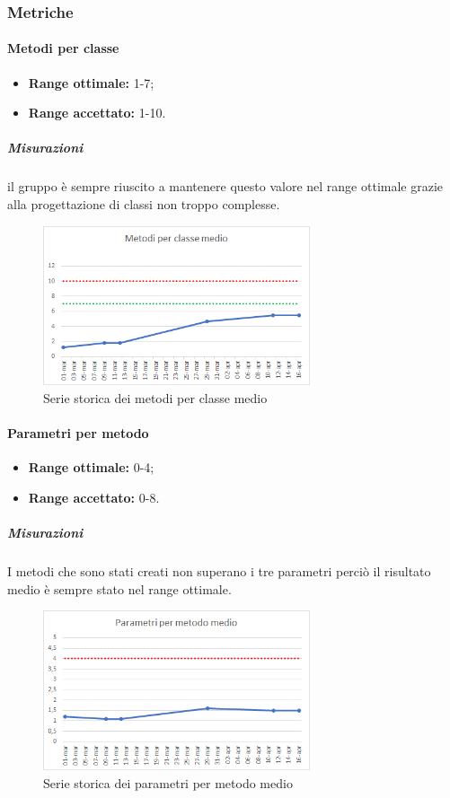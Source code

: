		\subsubsection{Metriche}
			\paragraph{Metodi per classe} \Spazio
			\begin{itemize}
				\item \textbf{Range ottimale:} 1-7; 
				\item \textbf{Range accettato:} 1-10.
			\end{itemize}
		    \subparagraph{Misurazioni}
		    il gruppo è sempre riuscito a mantenere questo valore nel range ottimale grazie alla progettazione di classi non troppo complesse.
		    \begin{figure}[H]
		    	\centering 
		    	\includegraphics[width=0.7\textwidth]{Images/metodi.png}
		    	\caption{Serie storica dei metodi per classe medio}
		    	\label{metodi} 
		    \end{figure}
	        
			\paragraph{Parametri per metodo} \Spazio
			\begin{itemize}
				\item \textbf{Range ottimale:} 0-4;
				\item \textbf{Range accettato:} 0-8.
			\end{itemize}
		    \subparagraph{Misurazioni}
		    I metodi che sono stati creati non superano i tre parametri perciò il risultato medio è sempre stato nel range ottimale.
		    \begin{figure}[H]
		    	\centering 
		    	\includegraphics[width=0.7\textwidth]{Images/parametri.png}
		    	\caption{Serie storica dei parametri per metodo medio}
		    	\label{parametri} 
		    \end{figure}
			
